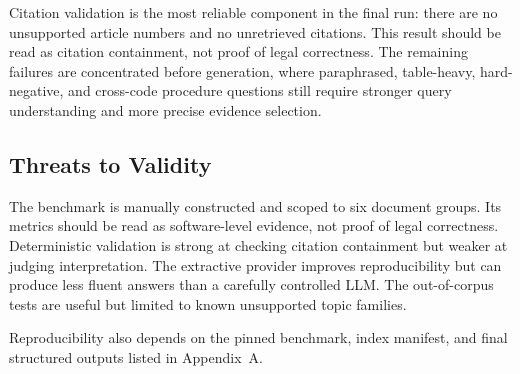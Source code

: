 Citation validation is the most reliable component in the final run: there are no unsupported article numbers and no unretrieved citations. This result should be read as citation containment, not proof of legal correctness. The remaining failures are concentrated before generation, where paraphrased, table-heavy, hard-negative, and cross-code procedure questions still require stronger query understanding and more precise evidence selection.

\subsection{Threats to Validity}
The benchmark is manually constructed and scoped to six document groups. Its metrics should be read as software-level evidence, not proof of legal correctness. Deterministic validation is strong at checking citation containment but weaker at judging interpretation. The extractive provider improves reproducibility but can produce less fluent answers than a carefully controlled LLM. The out-of-corpus tests are useful but limited to known unsupported topic families.

Reproducibility also depends on the pinned benchmark, index manifest, and final structured outputs listed in Appendix~A.
